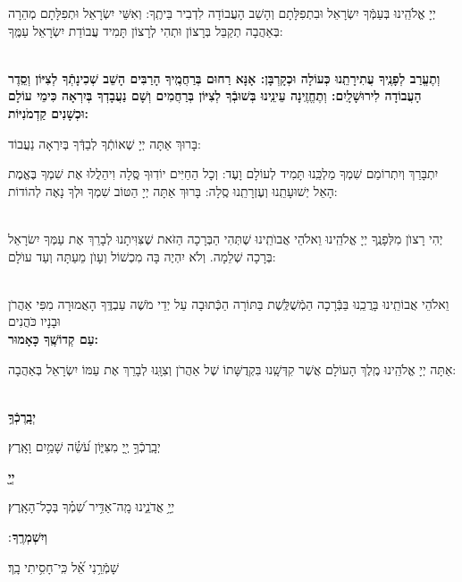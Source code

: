 \documentclass[twoside, openany, parskip=half, 11pt]{book}
\begin{document}
	 יְיָ אֱלֹהֵֽינוּ בְּעַמְּֿךָ יִשְׂרָאֵל וּבִתְפִלָּתָם וְהָשֵׁב הָעֲבוֹדָה לִדְבִיר בֵּיתֶֽךָ: וְאִשֵּׁי יִשְׂרָאֵל וּתְפִלָּתָם מְהֵרָה בְּאַהֲבָה תְקַבֵּל בְּרָצוֹן וּתְהִי לְרָצוֹן תָּמִיד עֲבוֹדַת יִשְׂרָאֵל עַמֶּֽךָ:
	
\chazzanvkahal \\
\textbf{
וְתֶעֱרַב לְפָנֶֽיךָ עֲתִירָתֵֽנוּ כְּעוֹלָה וּכְקָרְבָּן: 
אָנָּא רַחוּם בְּרַחֲמֶֽיךָ הָרַבִּים הָשֵׁב שְׁכִינָתְֿךָ לְצִיּוֹן וְסֵֽדֶר הָעֲבוֹדָה לִירוּשָׁלָֽיִם:
וְתֶחֱזֶֽינָה עֵינֵֽינוּ בְּשׁוּבְֿךָ לְצִיּוֹן בְּרַחֲמִים 
וְשָׁם נַעֲבָדְךָ בְּיִרְאָה כִּימֵי עוֹלָם וּכְשָׁנִים קַדְמֹנִיּוֹת:
} 

\chazzan
בָּרוּךְ אַתָּה יְיָ שֶׁאוֹתְֿךָ לְבַדְּֿךָ בְּיִרְאָה נַעֲבוֹד:

\modim

 יִתְבָּרַךְ וְיִתְרוֹמַם שִׁמְךָ מַלְכֵּֽנוּ תָּמִיד לְעוֹלָם וָעֶד: וְכָל הַחַיִּים יוֹדֽוּךָ סֶּֽלָה וִיהַלֲלוּ אֶת שִׁמְךָ בֶּאֱמֶת הָאֵל יְשׁוּעָתֵֽנוּ וְעֶזְרָתֵֽנוּ סֶֽלָה: בָּרוּךְ אַתָּה יְיָ הַטּוֹב שִׁמְךָ וּלְךָ נָאֶה לְהוֹדוֹת:

\\
יְהִי רָצוׂן מִלְּפָנֶֽךָ יְיָ אֱלֹהֵֽינוּ וֵאלֹהֵי אֲבוׂתֵֽינוּ שֶׁתְּהִי הַבְּרָכָה הַזֹּאת שֶׁצִּוִּיתָנוּ לְבָרֵךְ אֶת עַמְּךָ יִשׂרָאֵל בְּרָכָה שְׁלֵמָה. וְלֹא יִהְיֶה בָּה מִכְשׁוֹל וְעָוׂן מֵעַתָּה וְעַד עוׂלָם:

\\
 וֵאלֹהֵי אֲבוֹתֵֽינוּ בָּרֲכֵֽנוּ בַּבְּֿרָכָה הַמְֿשֻׁלֶּֽשֶׁת בַּתּוֹרָה הַכְּֿתוּבָה עַל יְדֵי מֹשֶׁה עַבְדֶּֽךָ הָאֲמוּרָה מִפִּי אַהֲרֹן וּבָנָיו כֹּהֲנִים \\
\textbf{עַם קְדוֹשֶֽׁךָ כָּאָמוּר:}

 אַתָּה יְיָ אֱלֹהֵֽינוּ מֶֽלֶךְ הָעוֹלָם אֲשֶׁר קִדְּשָֽׁנוּ בִּקְדֻשָּׁתוֹ שֶׁל אַהֲרֹן  וְצִוָּֽנוּ לְבָרֵךְ אֶת עַמּוֹ יִשְׂרָאֵל בְּאַהֲבָה:


\\
\textbf{יְבָֽרֶכְֿךָ֥}
	\hfill \begin{footnotesize}
	יְבָֽרֶכְֿךָ֣ יְ֖יָ מִצִּיּ֑וֹן עֹ֝שֵׂ֗ה שָׁמַ֥יִם וָאָֽרֶץ׃\\
	\end{footnotesize}
\textbf{יְיָ֖}
	\hfill		\begin{footnotesize}
	יְיָ֥ אֲדֹנֵ֑ינוּ מָֽה־אַדִּ֥יר שִׁ֝מְ֗ךָ בְּכָל־הָאָֽרֶץ׃\\
	\end{footnotesize}
\textbf{וְיִשְׁמְרֶֽךָ}
׃ \hfill		\begin{footnotesize}
 שָׁמְֿרֵ֥נִי אֵ֝֗ל כִּֽי־חָסִ֥יתִי בָֽךְ׃
\end{footnotesize}
\end{document}
